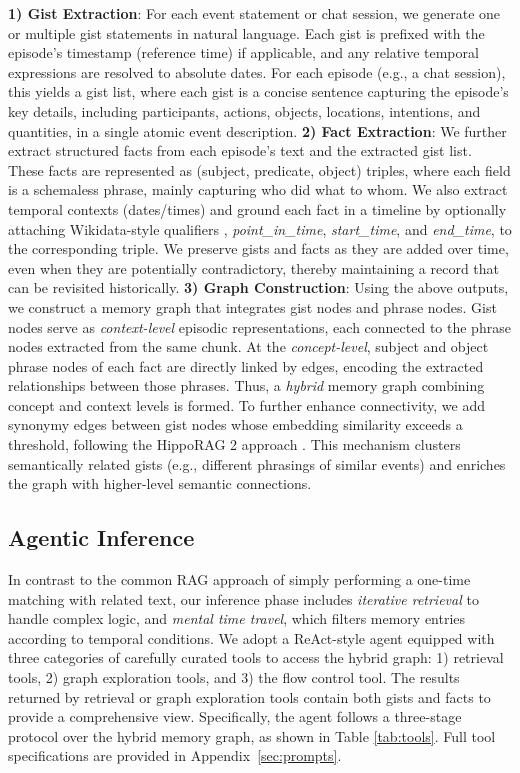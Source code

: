 \documentclass{article} %
\begin{document}
\textbf{1) Gist Extraction}:
For each event statement or chat session, we generate one or multiple gist statements in natural language. 
Each gist is prefixed with the episode's timestamp (reference time) if applicable, and any relative temporal expressions are resolved to absolute dates.
For each episode (e.g., a chat session), this yields a gist list, where each gist is a concise sentence capturing the episode’s key details, including participants, actions, objects, locations, intentions, and quantities, in a single atomic event description.
\textbf{2) Fact Extraction}:
We further extract structured facts from each episode's text and the extracted gist list.
These facts are represented as (subject, predicate, object) triples, where each field is a schemaless phrase, mainly capturing who did what to whom.
We also extract temporal contexts (dates/times) and ground each fact in a timeline by optionally attaching Wikidata-style qualifiers \citep{wikidata}, \textit{point\_in\_time}, \textit{start\_time}, and \textit{end\_time}, to the corresponding triple.
We preserve gists and facts as they are added over time, even when they are potentially contradictory, thereby maintaining a record that can be revisited historically.
\textbf{3) Graph Construction}:
Using the above outputs, we construct a memory graph that integrates gist nodes and phrase nodes.
Gist nodes serve as \textit{context-level} episodic representations, each connected to the phrase nodes extracted from the same chunk.
At the \textit{concept-level}, subject and object phrase nodes of each fact are directly linked by edges, encoding the extracted relationships between those phrases.
Thus, a \textit{hybrid} memory graph combining concept and context levels is formed.
To further enhance connectivity, we add synonymy edges between gist nodes whose embedding similarity exceeds a threshold, following the HippoRAG 2 approach \citep{hipporag2}.
This mechanism clusters semantically related gists (e.g., different phrasings of similar events) and enriches the graph with higher-level semantic connections.


\subsection{Agentic Inference}
\label{subsection:agentic_inference}

In contrast to the common RAG approach of simply performing a one-time matching with related text, our inference phase includes \textit{iterative retrieval} to handle complex logic, and \textit{mental time travel}, which filters memory entries according to temporal conditions.
We adopt a ReAct-style agent \citep{react,middleware} equipped with three categories of carefully curated tools to access the hybrid graph: 1) retrieval tools, 2) graph exploration tools, and 3) the flow control tool.
The results returned by retrieval or graph exploration tools contain both gists and facts to provide a comprehensive view.
Specifically, the agent follows a three-stage protocol over the hybrid memory graph, as shown in Table \ref{tab:tools}. 
Full tool specifications are provided in Appendix~\ref{sec:prompts}.
\end{document}
